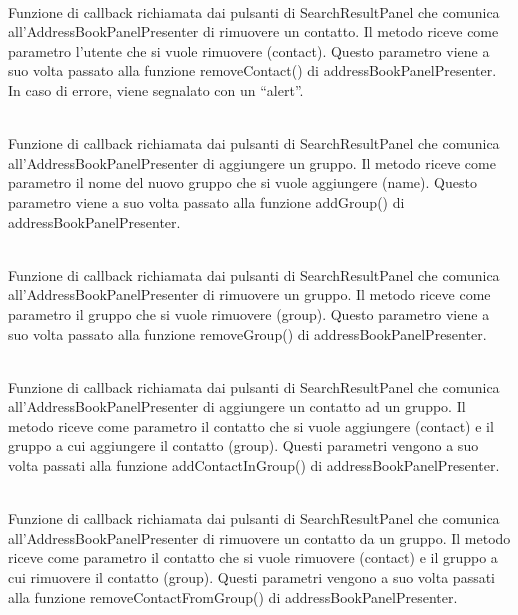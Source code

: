\begin{description}
\item{}\\
Funzione di callback richiamata dai pulsanti di SearchResultPanel che comunica all'AddressBookPanelPresenter di rimuovere un contatto. Il metodo riceve come parametro l'utente che si vuole rimuovere (contact). Questo parametro viene a suo volta passato alla funzione removeContact() di addressBookPanelPresenter. In caso di errore, viene segnalato con un ``alert''.

\item{}\\
Funzione di callback richiamata dai pulsanti di SearchResultPanel che comunica all'AddressBookPanelPresenter di aggiungere un gruppo. Il metodo riceve come parametro il nome del nuovo gruppo che si vuole aggiungere (name). Questo parametro viene a suo volta passato alla funzione addGroup() di addressBookPanelPresenter.


\item{}\\
Funzione di callback richiamata dai pulsanti di SearchResultPanel che comunica all'AddressBookPanelPresenter di rimuovere un gruppo. Il metodo riceve come parametro il gruppo che si vuole rimuovere (group). Questo parametro viene a suo volta passato alla funzione removeGroup() di addressBookPanelPresenter.


\item{}\\
Funzione di callback richiamata dai pulsanti di SearchResultPanel che comunica all'AddressBookPanelPresenter di aggiungere un contatto ad un gruppo. Il metodo riceve come parametro il contatto che si vuole aggiungere (contact) e il gruppo a cui aggiungere il contatto (group). Questi parametri vengono a suo volta passati alla funzione addContactInGroup() di addressBookPanelPresenter.


\item{}\\
Funzione di callback richiamata dai pulsanti di SearchResultPanel che comunica all'AddressBookPanelPresenter di rimuovere un contatto da un gruppo. Il metodo riceve come parametro il contatto che si vuole rimuovere (contact) e il gruppo a cui rimuovere il contatto (group). Questi parametri vengono a suo volta passati alla funzione removeContactFromGroup() di addressBookPanelPresenter.



\end{description}
